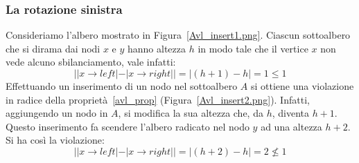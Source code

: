 \subsubsection{La rotazione sinistra}
Consideriamo l'albero mostrato in Figura~\ref{Avl_insert1.png}. Ciascun sottoalbero che si dirama dai nodi $x$ e $y$ hanno altezza $h$ in modo tale che il vertice $x$ non vede alcuno sbilanciamento, vale infatti:
\begin{displaymath}
||x\rightarrow left| - |x \rightarrow right|| = |(h+1) - h| = 1 \leq 1
\end{displaymath}
Effettuando un inserimento di un nodo nel sottoalbero $A$ si ottiene una violazione in radice della proprietà~\ref{avl_prop} (Figura~\ref{Avl_insert2.png}). Infatti, aggiungendo un nodo in $A$, si modifica la sua altezza che, da $h$, diventa $h+1$. Questo inserimento fa scendere l'albero radicato nel nodo $y$ ad una altezza $h+2$. Si ha così la violazione:
\begin{displaymath}
| |x \rightarrow left| - |x \rightarrow right||=|(h+2 )- h |=2 \nleq 1
\end{displaymath}

